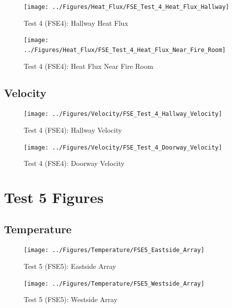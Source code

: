 \documentclass[12pt,oneside]{book}
\begin{document}
\begin{figure}[!ht]
	\texttt{[image: ../Figures/Heat\_Flux/FSE\_Test\_4\_Heat\_Flux\_Hallway]}
	\caption{Test 4 (FSE4): Hallway Heat Flux}
	\label{fig:Test_4_Hallway_Heat_Flux}
\end{figure}

\begin{figure}[!ht]
	\texttt{[image: ../Figures/Heat\_Flux/FSE\_Test\_4\_Heat\_Flux\_Near\_Fire\_Room]}
	\caption{Test 4 (FSE4): Heat Flux Near Fire Room}
	\label{fig:Test_4_Heat_Flux_Near_Fire_Room}
\end{figure}

\subsection{Velocity}
\label{subsec:Velocity}

\begin{figure}[!ht]
	\texttt{[image: ../Figures/Velocity/FSE\_Test\_4\_Hallway\_Velocity]}
	\caption{Test 4 (FSE4): Hallway Velocity}
	\label{fig:Test_4_Hallway_Velocity}
\end{figure}

\begin{figure}[!ht]
	\texttt{[image: ../Figures/Velocity/FSE\_Test\_4\_Doorway\_Velocity]}
	\caption{Test 4 (FSE4): Doorway Velocity}
	\label{fig:Test_4_Doorway_Velocity}
\end{figure}

\clearpage

\section{Test 5 Figures}
\label{subsec:Test_5_Figures}

\subsection{Temperature}
\label{subsec:Temperature}

\begin{figure}[!ht]
	\texttt{[image: ../Figures/Temperature/FSE5\_Eastside\_Array]}
	\caption{Test 5 (FSE5): Eastside Array}
	\label{fig:Test_5_Eastside_Array}
\end{figure}

\begin{figure}[!ht]
	\texttt{[image: ../Figures/Temperature/FSE5\_Westside\_Array]}
	\caption{Test 5 (FSE5): Westside Array}
	\label{fig:Test_5_Westside_Array}
\end{figure}
\end{document}
